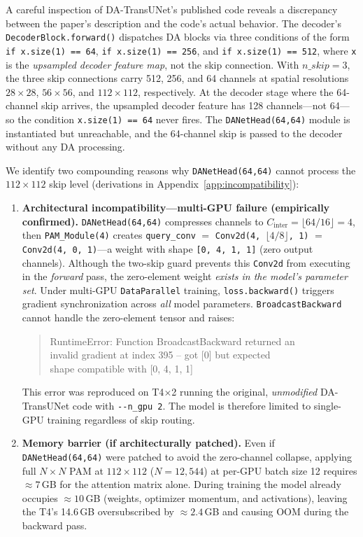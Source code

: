 \documentclass[conference]{IEEEtran}
\begin{document}
A careful inspection of DA-TransUNet's published code reveals a discrepancy between the paper's description and the code's actual behavior. The decoder's \texttt{DecoderBlock.forward()} dispatches DA blocks via three conditions of the form \texttt{if x.size(1) == 64}, \texttt{if x.size(1) == 256}, and \texttt{if x.size(1) == 512}, where \texttt{x} is the \emph{upsampled decoder feature map}, not the skip connection. With $n\_skip=3$, the three skip connections carry 512, 256, and 64 channels at spatial resolutions $28{\times}28$, $56{\times}56$, and $112{\times}112$, respectively. At the decoder stage where the 64-channel skip arrives, the upsampled decoder feature has 128 channels---not 64---so the condition \texttt{x.size(1) == 64} never fires. The \texttt{DANetHead(64,64)} module is instantiated but unreachable, and the 64-channel skip is passed to the decoder without any DA processing.

We identify two compounding reasons why \texttt{DANetHead(64,64)} cannot process the $112{\times}112$ skip level (derivations in Appendix~\ref{app:incompatibility}):

\begin{enumerate}
  \item \textbf{Architectural incompatibility---multi-GPU failure (empirically confirmed).} \texttt{DANetHead(64,64)} compresses channels to $C_{\text{inter}} = \lfloor 64/16 \rfloor = 4$, then \texttt{PAM\_Module(4)} creates \texttt{query\_conv} $=$ \texttt{Conv2d(4,\,$\lfloor 4/8 \rfloor$,\,1)} $=$ \texttt{Conv2d(4,\,0,\,1)}---a weight with shape \texttt{[0,\,4,\,1,\,1]} (zero output channels). Although the two-skip guard prevents this \texttt{Conv2d} from executing in the \emph{forward} pass, the zero-element weight \emph{exists in the model's parameter set}. Under multi-GPU \texttt{DataParallel} training, \texttt{loss.backward()} triggers gradient synchronization across \emph{all} model parameters. \texttt{BroadcastBackward} cannot handle the zero-element tensor and raises:
  \begin{quote}
  {\small\ttfamily
  RuntimeError: Function BroadcastBackward returned an\\
  invalid gradient at index 395 -- got [0] but expected\\
  shape compatible with [0, 4, 1, 1]}
  \end{quote}
  This error was reproduced on T4$\times$2 running the original, \emph{unmodified} DA-TransUNet code with \texttt{{-}{-}n\_gpu~2}. The model is therefore limited to single-GPU training regardless of skip routing.
  \item \textbf{Memory barrier (if architecturally patched).} Even if \texttt{DANetHead(64,64)} were patched to avoid the zero-channel collapse, applying full $N{\times}N$ PAM at $112{\times}112$ ($N{=}12{,}544$) at per-GPU batch size 12 requires ${\approx}7$\,GB for the attention matrix alone. During training the model already occupies ${\approx}10$\,GB (weights, optimizer momentum, and activations), leaving the T4's 14.6\,GB oversubscribed by ${\approx}2.4$\,GB and causing OOM during the backward pass.
\end{enumerate}
\end{document}
